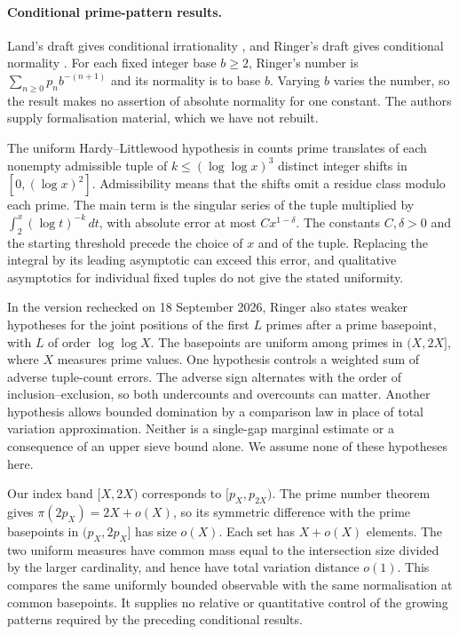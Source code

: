 \documentclass[11pt]{article}
\begin{document}
\paragraph{Conditional prime-pattern results.}
Land's draft gives conditional irrationality
\cite[Conjecture~1, Theorem~2]{land2026}, and Ringer's draft gives
conditional normality \cite{ringer2026}.  For each fixed integer base
$b\ge2$, Ringer's number is $\sum_{n\ge0}p_nb^{-(n+1)}$ and its
normality is to base $b$.  Varying $b$ varies the number, so the result
makes no assertion of absolute normality for one constant.
The authors supply formalisation material, which we have not rebuilt.

The uniform Hardy--Littlewood hypothesis in
\cite[Conjecture~1.3]{kuperberg2023} counts prime translates of each
nonempty admissible tuple of $k\le(\log\log x)^3$ distinct integer
shifts in $[0,(\log x)^2]$.  Admissibility means that the shifts omit a
residue class modulo each prime.  The main term is the singular series
of the tuple multiplied by $\int_2^x(\log t)^{-k}\,dt$, with absolute
error at most $Cx^{1-\delta}$.  The constants $C,\delta>0$ and the
starting threshold precede the choice of $x$ and of the tuple.
Replacing the integral by its leading asymptotic can exceed this error,
and qualitative asymptotics for individual fixed tuples do not give
the stated uniformity.

In the version rechecked on 18 September 2026, Ringer also states weaker
hypotheses for the joint positions of the first $L$ primes after a prime
basepoint, with $L$ of order $\log\log X$.  The basepoints are uniform
among primes in $(X,2X]$, where $X$ measures prime values.
One hypothesis controls a weighted sum of adverse tuple-count errors.
The adverse sign alternates with the order of inclusion--exclusion,
so both undercounts and overcounts can matter.  Another hypothesis
allows bounded domination by a comparison law in place of total variation
approximation.  Neither is a single-gap marginal estimate or a consequence
of an upper sieve bound alone.  We assume none of these hypotheses here.

Our index band $[X,2X)$ corresponds to $[p_X,p_{2X})$.  The prime number
theorem gives $\pi(2p_X)=2X+o(X)$, so its symmetric difference with the
prime basepoints in $(p_X,2p_X]$ has size $o(X)$.  Each set has
$X+o(X)$ elements.  The two uniform measures have common mass equal to
the intersection size divided by the larger cardinality, and hence
have total variation distance $o(1)$.  This compares the same uniformly
bounded observable with the same normalisation at common basepoints.
It supplies no relative or quantitative control of the growing patterns
required by the preceding conditional results.
\end{document}
